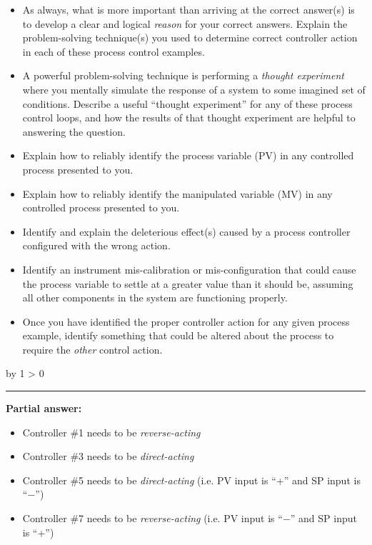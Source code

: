 \documentclass[12pt,a4paper]{article}
\def\svar{
           \advance\answnum by 1
           \ifnum \answnum > 0
                \hrule
                \vskip 3pt
                \leftline{Svar \the\answnum}
                \vskip 3pt \fi}
\begin{document}
\begin{itemize}
\item{} As always, what is more important than arriving at the correct answer(s) is to develop a clear and logical {\it reason} for your correct answers.  Explain the problem-solving technique(s) you used to determine correct controller action in each of these process control examples.
\item{} A powerful problem-solving technique is performing a {\it thought experiment} where you mentally simulate the response of a system to some imagined set of conditions.  Describe a useful ``thought experiment'' for any of these process control loops, and how the results of that thought experiment are helpful to answering the question.
\item{} Explain how to reliably identify the process variable (PV) in any controlled process presented to you.
\item{} Explain how to reliably identify the manipulated variable (MV) in any controlled process presented to you.
\item{} Identify and explain the deleterious effect(s) caused by a process controller configured with the wrong action.
\item{} Identify an instrument mis-calibration or mis-configuration that could cause the process variable to settle at a greater value than it should be, assuming all other components in the system are functioning properly.
\item{} Once you have identified the proper controller action for any given process example, identify something that could be altered about the process to require the {\it other} control action.
\end{itemize}

\vskip 10pt \filbreak 





\svar{} 

\noindent
{\bf Partial answer:}

\begin{itemize}
\item{} Controller \#1 needs to be {\it reverse-acting}
\item{} Controller \#3 needs to be {\it direct-acting}
\item{} Controller \#5 needs to be {\it direct-acting} (i.e. PV input is ``+'' and SP input is ``$-$'')
\item{} Controller \#7 needs to be {\it reverse-acting} (i.e. PV input is ``$-$'' and SP input is ``+'')
\end{itemize}
\end{document}
